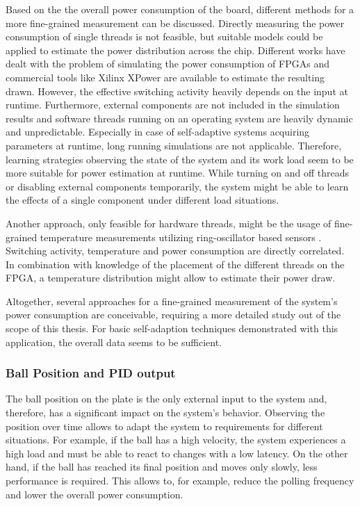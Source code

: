 Based on the the overall power consumption of the board, different methods for
a more fine-grained measurement can be discussed. Directly measuring the power
consumption of single threads is not feasible, but suitable models could be
applied to estimate the power distribution across the chip. Different works
have dealt with the problem of simulating the power consumption of \acp{FPGA}
\citep{DeTu05,JeCa11} and commercial tools like Xilinx XPower are available to
estimate the resulting drawn. However, the effective switching activity
heavily depends on the input at runtime. Furthermore, external components are
not included in the simulation results and software threads running on an
operating system are heavily dynamic and unpredictable. Especially in case of
self-adaptive systems acquiring parameters at runtime, long running
simulations are not applicable. Therefore, learning strategies observing the
state of the system and its work load seem to be more suitable for power
estimation at runtime. While turning on and off threads or disabling external
components temporarily, the system might be able to learn the effects of a
single component under different load situations.

Another approach, only feasible for hardware threads, might be the usage of
fine-grained temperature measurements utilizing ring-oscillator based sensors
\citep{RAH12,JJR13}. Switching activity, temperature and power consumption are
directly correlated. In combination with knowledge of the placement of the
different threads on the \ac{FPGA}, a temperature distribution might allow to
estimate their power draw.

Altogether, several approaches for a fine-grained measurement of the system's
power consumption are conceivable, requiring a more detailed study out of the
scope of this thesis. For basic self-adaption techniques demonstrated with
this application, the overall data seems to be sufficient.

\subsubsection{Ball Position and \acs{PID} output}
The ball position on the plate is the only external input to the system and,
therefore, has a significant impact on the system's behavior. Observing the
position over time allows to adapt the system to requirements for different
situations. For example, if the ball has a high velocity, the system
experiences a high load and must be able to react to changes with a low
latency. On the other hand, if the ball has reached its final position and
moves only slowly, less performance is required. This allows to, for example,
reduce the polling frequency and lower the overall power consumption.

